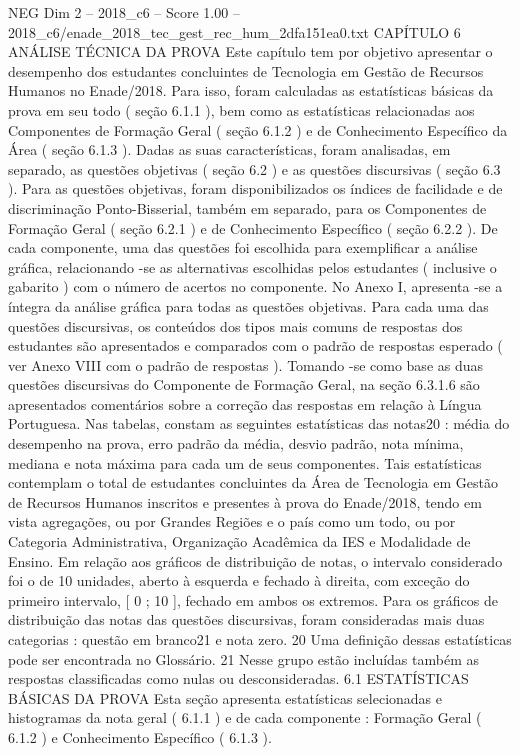 \begin{textsample}{NEG Dim 2 – 2018\_c6 – Score 1.00 – 2018\_c6/enade\_2018\_tec\_gest\_rec\_hum\_2dfa151ea0.txt}  \label{ex:f2_neg_240}
CAPÍTULO 6 ANÁLISE TÉCNICA DA PROVA Este capítulo tem por objetivo apresentar o desempenho dos estudantes concluintes de Tecnologia em Gestão de Recursos Humanos no Enade/2018.
Para isso, foram calculadas as estatísticas básicas da prova em seu todo ( seção 6.1.1 ), bem como as estatísticas relacionadas aos Componentes de Formação Geral ( seção 6.1.2 ) e de Conhecimento Específico da Área ( seção 6.1.3 ).
Dadas as suas características, foram analisadas, em separado, as questões objetivas ( seção 6.2 ) e as questões discursivas ( seção 6.3 ).
Para as questões objetivas, foram disponibilizados os índices de facilidade e de discriminação Ponto-Bisserial, também em separado, para os Componentes de Formação Geral ( seção 6.2.1 ) e de Conhecimento Específico ( seção 6.2.2 ).
De cada componente, uma das questões foi escolhida para exemplificar a análise gráfica, relacionando -se as alternativas escolhidas pelos estudantes ( inclusive o gabarito ) com o número de acertos no componente.
No Anexo I, apresenta -se a íntegra da análise gráfica para todas as questões objetivas.
Para cada uma das questões discursivas, os conteúdos dos tipos mais comuns de respostas dos estudantes são apresentados e comparados com o padrão de respostas esperado ( ver Anexo VIII com o padrão de respostas ).
Tomando -se como base as duas questões discursivas do Componente de Formação Geral, na seção 6.3.1.6 são apresentados comentários sobre a correção das respostas em relação à Língua Portuguesa.
Nas tabelas, constam as seguintes estatísticas das notas20 : média do desempenho na prova, erro padrão da média, desvio padrão, nota mínima, mediana e nota máxima para cada um de seus componentes.
Tais estatísticas contemplam o total de estudantes concluintes da Área de Tecnologia em Gestão de Recursos Humanos inscritos e presentes à prova do Enade/2018, tendo em vista agregações, ou por Grandes Regiões e o país como um todo, ou por Categoria Administrativa, Organização Acadêmica da IES e Modalidade de Ensino.
Em relação aos gráficos de distribuição de notas, o intervalo considerado foi o de 10 unidades, aberto à esquerda e fechado à direita, com exceção do primeiro intervalo, [ 0 ; 10 ], fechado em ambos os extremos.
Para os gráficos de distribuição das notas das questões discursivas, foram consideradas mais duas categorias : questão em branco21 e nota zero. 20 Uma definição dessas estatísticas pode ser encontrada no Glossário. 21 Nesse grupo estão incluídas também as respostas classificadas como nulas ou desconsideradas. 6.1 ESTATÍSTICAS BÁSICAS DA PROVA Esta seção apresenta estatísticas selecionadas e histogramas da nota geral ( 6.1.1 ) e de cada componente : Formação Geral ( 6.1.2 ) e Conhecimento Específico ( 6.1.3 ).

\end{textsample}

